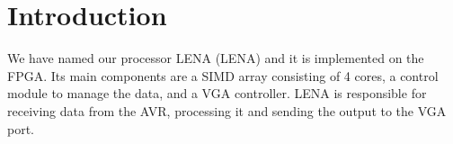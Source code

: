 \section{Introduction}

We have named our processor \acs{LENA} (\acl{LENA}) and it is implemented on the
\ac{FPGA}. Its main components are a \ac{SIMD} array consisting of 4 cores, a
control module to manage the data, and a \ac{VGA} controller. \ac{LENA} is
responsible for receiving data from the \ac{AVR}, processing it and sending the
output to the \ac{VGA} port.
